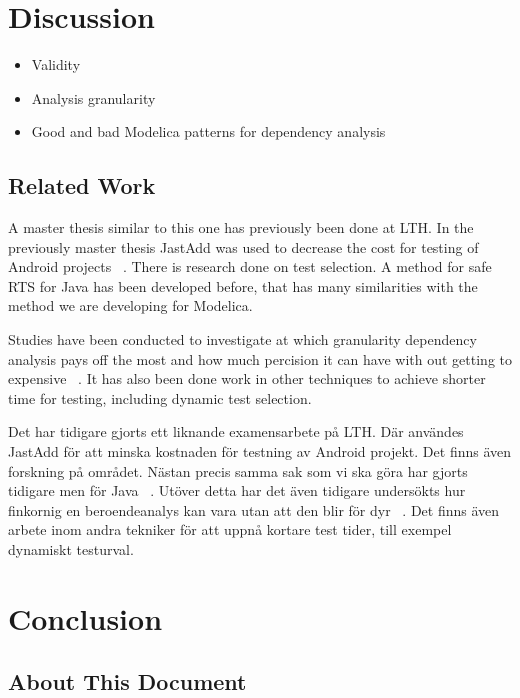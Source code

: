 \documentclass{cslthse-msc}
\begin{document}
\chapter[Discussion]{Discussion}



\begin{itemize}
	\item Validity
	\item Analysis granularity
    \item Good and bad Modelica patterns for dependency analysis
\end{itemize}

\section{Related Work}

A master thesis similar to this one has previously been done at LTH. In the previously master thesis JastAdd was used to decrease the cost for testing of Android projects ~\cite{kampe2012dependroid}. There is research done on test selection. A method for safe RTS for Java has been developed before, that has many similarities with the method we are developing for Modelica. 

Studies have been conducted to investigate at which granularity dependency analysis pays off the most and how much percision it can have with out getting to expensive ~\cite{DBLP:conf/sigsoft/LegunsenHSLZM16}. It has also been done work in other techniques to achieve shorter time for testing, including dynamic test selection.

Det har tidigare gjorts ett liknande examensarbete på LTH. Där användes JastAdd för att minska kostnaden för testning av Android projekt. Det finns även forskning på området. Nästan precis samma sak som vi ska göra har gjorts tidigare men för Java ~\cite{DBLP:conf/pppj/OqvistHM16}. Utöver detta har det även tidigare undersökts hur finkornig en beroendeanalys kan vara utan att den blir för dyr ~\cite{DBLP:conf/sigsoft/LegunsenHSLZM16}. Det finns även arbete inom andra tekniker för att uppnå kortare test tider, till exempel dynamiskt testurval.
\chapter[Conclusion]{Conclusion}

\begin{appendices}
\chapter{About This Document}
\end{appendices}
\end{document}
